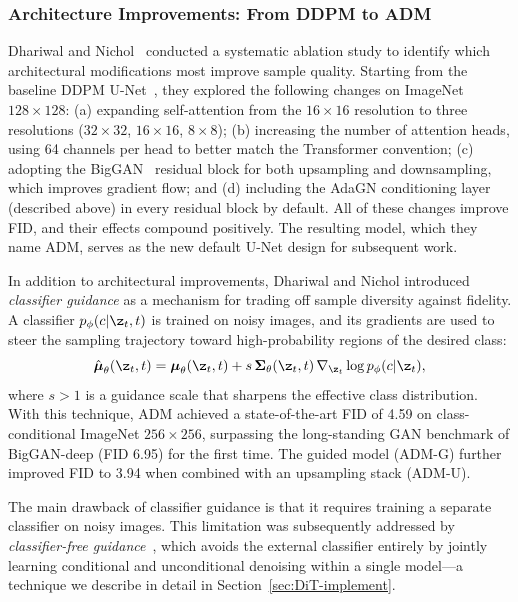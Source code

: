\documentclass[../../book-main.tex]{subfiles}
\begin{document}
\subsubsection{Architecture Improvements: From DDPM to ADM}
\label{sec:unet-adm}

Dhariwal and Nichol~\citep{dhariwal2021diffusion} conducted a
systematic ablation study to identify which architectural
modifications most improve sample quality. Starting from the baseline
DDPM U-Net~\citep{ho2020denoising}, they explored the following
changes on ImageNet $128 \times 128$: (a) expanding self-attention
from the $16 \times 16$ resolution to three resolutions ($32 \times
32$, $16 \times 16$, $8 \times 8$); (b) increasing the number of
attention heads, using 64 channels per head to better match the
Transformer convention; (c) adopting the
BigGAN~\citep{brock2019large} residual block for both upsampling and
downsampling, which improves gradient flow; and (d) including the
AdaGN conditioning layer (described above) in every residual block by
default. All of these changes improve FID, and their effects compound
positively. The resulting model, which they name ADM, serves as the
new default U-Net design for subsequent work.

In addition to architectural improvements, Dhariwal and Nichol
introduced \emph{classifier guidance} as a mechanism for trading off
sample diversity against fidelity. A classifier $p_\phi(c|\z_t, t)$
is trained on noisy images, and its gradients are used to steer the
sampling trajectory toward high-probability regions of the desired class:
\begin{equation}
\hat{\boldsymbol{\mu}}_\theta(\z_t, t) =
\boldsymbol{\mu}_\theta(\z_t, t) + s \,
\boldsymbol{\Sigma}_\theta(\z_t, t) \, \nabla_{\z_t} \log p_\phi(c|\z_t),
\end{equation}
where $s > 1$ is a guidance scale that sharpens the effective class
distribution. With this technique, ADM achieved a state-of-the-art
FID of 4.59 on class-conditional ImageNet $256 \times 256$,
surpassing the long-standing GAN benchmark of BigGAN-deep (FID 6.95)
for the first time. The guided model (ADM-G) further improved FID to
3.94 when combined with an upsampling stack (ADM-U).

The main drawback of classifier guidance is that it requires training
a separate classifier on noisy images. This limitation was
subsequently addressed by \emph{classifier-free
guidance}~\citep{ho2022classifier}, which avoids the external
classifier entirely by jointly learning conditional and unconditional
denoising within a single model---a technique we describe in detail
in Section~\ref{sec:DiT-implement}.
\end{document}

